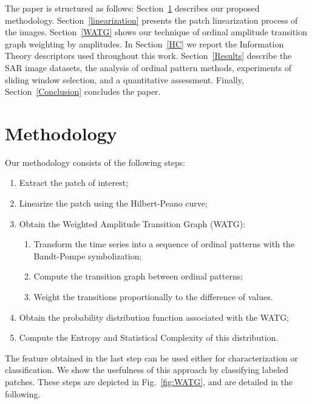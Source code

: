 \documentclass[journal]{IEEEtran}
\begin{document}

The paper is structured as follows:
Section~\ref{methodology} describes our proposed methodology.
Section~\ref{linearization} presents the patch linearization process of the images.
Section~\ref{WATG} shows our technique of ordinal amplitude transition graph weighting by amplitudes.
In Section~\ref{HC} we report the Information Theory descriptors used throughout this work.
Section~\ref{Results} describe the SAR image datasets, 
the analysis of ordinal pattern methods, 
experiments of sliding window selection, and a
quantitative assessment.
Finally, Section~\ref{Conclusion} concludes the paper.

\section{Methodology}\label{methodology}

Our methodology consists of the following steps:
\begin{enumerate}
	\item \label{item:texture} Extract the patch of interest;
	\item\label{item:Linearlize} Linearize the patch using the Hilbert-Peano curve;
	\item \label{item:Procedure} Obtain the Weighted Amplitude Transition Graph (WATG):
		\begin{enumerate}
			\item \label{item:Symbolization} Transform the time series into a sequence of ordinal patterns with the Bandt-Pompe symbolization;
			\item Compute the transition graph between ordinal patterns;
			\item Weight the transitions proportionally to the difference of values.
		\end{enumerate}
	\item \label{item:WATG} Obtain the probability distribution function associated with the WATG;
	\item\label{item:Descriptors} Compute the Entropy and Statistical Complexity of this distribution.
\end{enumerate}
The feature obtained in the last step can be used either for characterization or classification.
We show the usefulness of this approach by classifying labeled patches.
These steps are depicted in Fig.~\ref{fig:WATG}, and are detailed in the following.
\end{document}
